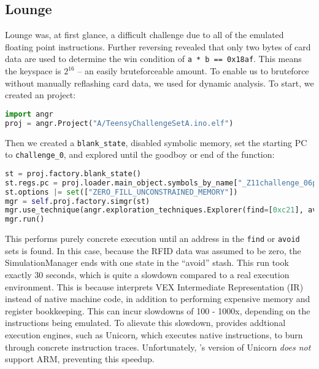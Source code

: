 \subsection{Lounge}
\label{sec:lounge}
Lounge was, at first glance, a difficult challenge due to all of the emulated floating point instructions. Further reversing revealed that only two bytes of card data are used to determine the win condition of \texttt{a * b == 0x18af}. This means the keyspace is $2^{16}$ -- an easily bruteforceable amount. To enable us to bruteforce without manually reflashing card data, we used \angr for dynamic analysis. To start, we created an \angr project:

\begin{lstlisting}[language=python]
import angr
proj = angr.Project("A/TeensyChallengeSetA.ino.elf")
\end{lstlisting}

Then we created a \texttt{blank\_state}, disabled symbolic memory, set the starting PC to \texttt{challenge\_0}, and explored until the goodboy or end of the function:

\begin{lstlisting}[language=python]
st = proj.factory.blank_state()
st.regs.pc = proj.loader.main_object.symbols_by_name["_Z11challenge_06packet"].linked_addr
st.options |= set(["ZERO_FILL_UNCONSTRAINED_MEMORY"])
mgr = self.proj.factory.simgr(st)
mgr.use_technique(angr.exploration_techniques.Explorer(find=[0xc21], avoid=[0xc51]))
mgr.run()
\end{lstlisting}

This performs purely concrete execution until an address in the \texttt{find}
or \texttt{avoid} sets is found. In this case, because the RFID data was
assumed to be zero, the SimulationManager ends with one state in the ``avoid'' stash.
This run took exactly 30 seconds, which is quite a slowdown compared to a real
execution environment. This is because \angr interprets VEX Intermediate
Representation (IR) instead of native machine code, in addition to performing
expensive memory and register bookkeeping. This can incur slowdowns of 100 -
1000x, depending on the instructions being emulated. To alievate this slowdown,
\angr provides addtional execution engines, such as Unicorn\href{http://www.unicorn-engine.org/}, which
executes native instructions, to burn through concrete instruction traces.
Unfortunately, \angr's version of Unicorn \emph{does not} support ARM,
preventing this speedup.

